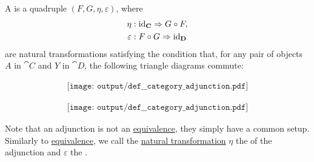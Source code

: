 \begin{definition}
\begin{thmenum}
     A  is a quadruple \( (F, G, \eta, \varepsilon) \), where
    \begin{equation}\label{eq:def:category_adjunction/unit_counit/signature}
      \begin{aligned}
               \eta &: \id_{\cat{C}} \Rightarrow G \bincirc F, \\
        \varepsilon &: F \bincirc G \Rightarrow \id_{\cat{D}}
      \end{aligned}
    \end{equation}
    are natural transformations satisfying the condition that, for any pair of objects \( A \) in \( \cat{C} \) and \( Y \) in \( \cat{D} \), the following triangle diagrams commute:

    \begin{minipage}{0.43\textwidth}
      \begin{equation}\label{eq:def:category_adjunction/d_triangle}
        \begin{aligned}
          \texttt{[image: output/def\_\_category\_adjunction.pdf]}
        \end{aligned}
      \end{equation}
    \end{minipage}
    \hfill
    \begin{minipage}{0.44\textwidth}
      \raggedright
      \begin{equation}\label{eq:def:category_adjunction/c_triangle}
        \begin{aligned}
          \texttt{[image: output/def\_\_category\_adjunction.pdf]}
        \end{aligned}
      \end{equation}
    \end{minipage}
    \smallskip

    Note that an adjunction is not an \hyperref[def:category_equivalence]{equivalence}, they simply have a common setup. Similarly to \hyperref[def:category_equivalence]{equivalence}, we call the \hyperref[def:natural_transformation]{natural transformation} \( \eta \) the  of the adjunction and \( \varepsilon \) the .
  \end{thmenum}
\end{definition}
